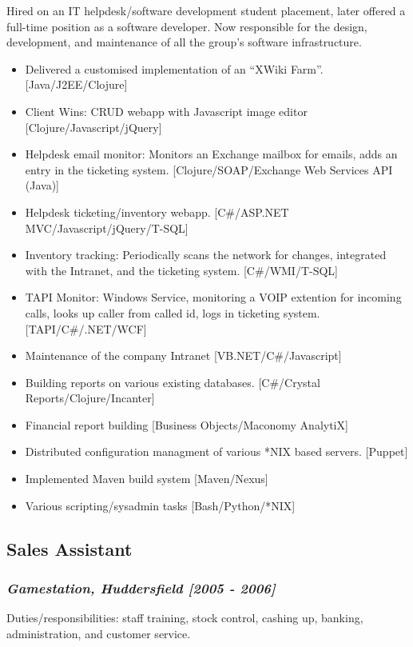 \documentclass{article}
\begin{document}
Hired on an IT helpdesk/software development student placement, later offered a full-time position as a software developer. Now responsible for the design, development, and maintenance of all the group's software infrastructure.
\begin{itemize}
\item Delivered a customised implementation of an ``XWiki Farm''. [Java/J2EE/Clojure]
\item Client Wins: CRUD webapp with Javascript image editor [Clojure/Javascript/jQuery]
\item Helpdesk email monitor: Monitors an Exchange mailbox for emails, adds an entry in the ticketing system. [Clojure/SOAP/Exchange Web Services API (Java)]
\item Helpdesk ticketing/inventory webapp. [C\#/ASP.NET MVC/Javascript/jQuery/T-SQL]
\item Inventory tracking: Periodically scans the network for changes, integrated with the Intranet, and the ticketing system. [C\#/WMI/T-SQL]
\item TAPI Monitor: Windows Service, monitoring a VOIP extention for incoming calls, looks up caller from called id, logs in ticketing system. [TAPI/C\#/.NET/WCF]
\item Maintenance of the company Intranet [VB.NET/C\#/Javascript]
\item Building reports on various existing databases. [C\#/Crystal Reports/Clojure/Incanter]
\item Financial report building [Business Objects/Maconomy AnalytiX]
\item Distributed configuration managment of various *NIX based servers. [Puppet]
\item Implemented Maven build system [Maven/Nexus]
\item Various scripting/sysadmin tasks [Bash/Python/*NIX]
\end{itemize}
\subsection*{Sales Assistant}
\label{sec-3.2}

\subsubsection*{\emph{Gamestation, Huddersfield [2005 - 2006]}}
\label{sec-3.2.1}

Duties/responsibilities: staff training, stock control, cashing up, banking, administration, and customer service.
\end{document}
